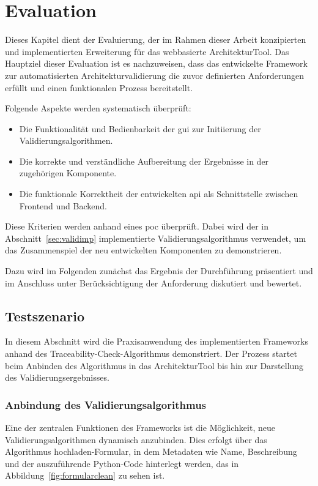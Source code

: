 
\chapter{Evaluation}
\label{ch:evaluation}

Dieses Kapitel dient der Evaluierung, der im Rahmen dieser Arbeit konzipierten und implementierten Erweiterung für das webbasierte ArchitekturTool. Das Hauptziel dieser Evaluation ist es nachzuweisen, dass das entwickelte Framework zur automatisierten Architekturvalidierung die zuvor definierten Anforderungen erfüllt und einen funktionalen Prozess bereitstellt.

Folgende Aspekte werden systematisch überprüft:
\begin{itemize}
  \item Die Funktionalität und Bedienbarkeit der \gls{gui} zur Initiierung der Validierungsalgorithmen.
  \item Die korrekte und verständliche Aufbereitung der Ergebnisse in der zugehörigen Komponente.
  \item Die funktionale Korrektheit der entwickelten \gls{api} als Schnittstelle zwischen Frontend und Backend.
\end{itemize}

Diese Kriterien werden anhand eines \gls{poc} überprüft. Dabei wird der in Abschnitt~\ref{sec:validimp} implementierte Validierungsalgorithmus verwendet, um das Zusammenspiel der neu entwickelten Komponenten zu demonstrieren.

Dazu wird im Folgenden zunächst   das Ergebnis der Durchführung präsentiert und im Anschluss unter Berücksichtigung der Anforderung diskutiert und bewertet.

\section{Testszenario}
\label{sec:testszenario}

In diesem Abschnitt wird die Praxisanwendung des implementierten Frameworks anhand des Traceability-Check-Algorithmus demonstriert. Der Prozess startet beim Anbinden des Algorithmus in das ArchitekturTool bis hin zur Darstellung des Validierungsergebnisses.

\subsection{Anbindung des Validierungsalgorithmus}
Eine der zentralen Funktionen des Frameworks ist die Möglichkeit, neue Validierungsalgorithmen dynamisch anzubinden. Dies erfolgt über das \glqq Algorithmus hochladen\grqq{}-Formular, in dem Metadaten wie Name, Beschreibung und der auszuführende Python-Code hinterlegt werden, das in Abbildung~\ref{fig:formularclean} zu sehen ist.

